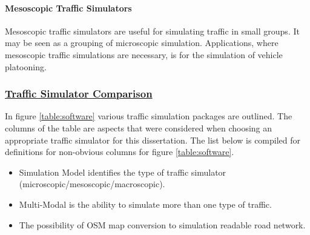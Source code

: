 \paragraph{Mesoscopic Traffic Simulators}
Mesoscopic traffic simulators are useful for simulating traffic in small groups. It may be seen as a grouping of microscopic simulation. Applications, where mesoscopic traffic simulations are necessary, is for the simulation of vehicle platooning.

\subsubsection{\underline{Traffic Simulator Comparison}}
In figure \ref{table:software} various traffic simulation packages are outlined. The columns of the table are aspects that were considered when choosing an appropriate traffic simulator for this dissertation. The list below is compiled for definitions for non-obvious columns for figure \ref{table:software}.
\begin{itemize}
    \item Simulation Model identifies the type of traffic simulator (microscopic/mesoscopic/macroscopic).
    \item Multi-Modal is the ability to simulate more than one type of traffic.
    \item The possibility of \ac{OSM} map conversion to simulation readable road network.
\end{itemize}

